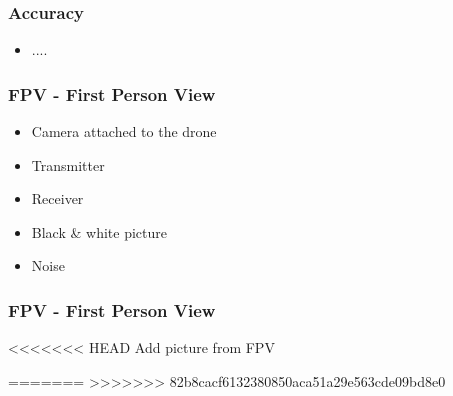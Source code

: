 \begin{frame}
\frametitle{Accuracy}

  \begin{itemize}
    \item ....
  \end{itemize}  
\end{frame}

\begin{frame}
\frametitle{FPV - First Person View}

  \begin{itemize}
  	\item Camera attached to the drone
    \item Transmitter    
    \item Receiver   
	\item Black \& white picture
	\item Noise 
  \end{itemize}
  
\end{frame}


\begin{frame}
\frametitle{FPV - First Person View}

<<<<<<< HEAD
	Add picture from FPV
  
\end{frame}
=======
>>>>>>> 82b8cacf6132380850aca51a29e563cde09bd8e0

